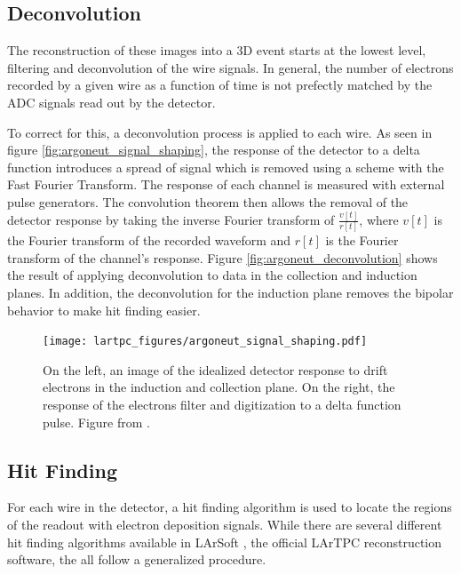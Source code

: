 \subsection{Deconvolution}
The reconstruction of these images into a 3D event starts at the lowest level, filtering and deconvolution of the wire signals.  In general, the number of electrons recorded by a given wire as a function of time is not prefectly matched by the ADC signals read out by the detector.

To correct for this, a deconvolution process is applied to each wire.  As seen in figure \ref{fig:argoneut_signal_shaping}, the response of the detector to a delta function introduces a spread of signal which is removed using a scheme with the Fast Fourier Transform. The response of each channel is measured with external pulse generators.  The convolution theorem then allows the removal of the detector response by taking the  inverse Fourier transform of $\frac{v[t]}{r[t]}$, where $v[t]$ is the Fourier transform of the recorded waveform and $r[t]$ is the Fourier transform of the channel's response.  Figure \ref{fig:argoneut_deconvolution} shows the result of applying deconvolution to \argoneut data in the collection and induction planes.  In addition, the deconvolution for the induction plane removes the bipolar behavior to make hit finding easier.


\begin{figure}[h]
  \centering
  \texttt{[image: lartpc\_figures/argoneut\_signal\_shaping.pdf]}
  \caption{On the left, an image of the idealized detector response to drift electrons in the induction and collection plane.  On the right, the response of the electrons filter and digitization to a delta function pulse.  Figure from \cite{Anderson:2012vc}.}
  \label{fig:signal_shaping}
\end{figure}

\subsection{Hit Finding}

For each wire in the detector, a hit finding algorithm is used to locate the regions of the readout with electron deposition signals.  While there are several different hit finding algorithms available in LArSoft \cite{Church:2013hea}, the official LArTPC reconstruction software, the all follow a generalized procedure.

